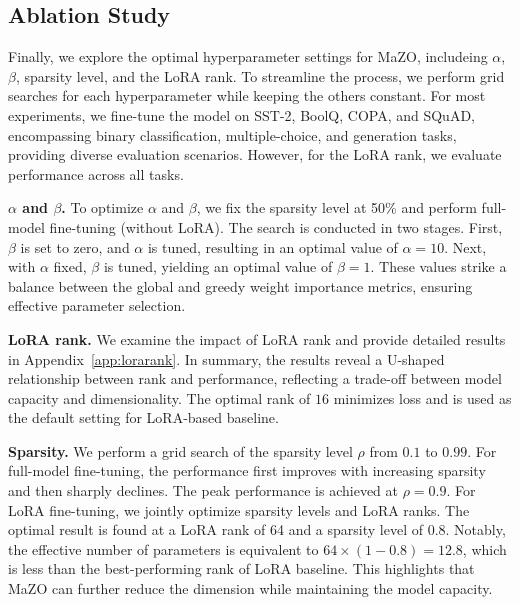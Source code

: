 \subsection{Ablation Study}  



Finally, we explore the optimal hyperparameter settings for MaZO, includeing $\alpha$, $\beta$, sparsity level, and the LoRA rank. To streamline the process, we perform grid searches for each hyperparameter while keeping the others constant. For most experiments, we fine-tune the model on SST-2, BoolQ, COPA, and SQuAD, encompassing binary classification, multiple-choice, and generation tasks, providing diverse evaluation scenarios. However, for the LoRA rank, we evaluate performance across all tasks.




\textbf{$\alpha$ and $\beta$.}  
To optimize $\alpha$ and $\beta$, we fix the sparsity level at 50\% and perform full-model fine-tuning (without LoRA). The search is conducted in two stages. First, $\beta$ is set to zero, and $\alpha$ is tuned, resulting in an optimal value of $\alpha = 10$. Next, with $\alpha$ fixed, $\beta$ is tuned, yielding an optimal value of $\beta = 1$. These values strike a balance between the global and greedy weight importance metrics, ensuring effective parameter selection.

\textbf{LoRA rank.} 
We examine the impact of LoRA rank and provide detailed results in Appendix~\ref{app:lorarank}. In summary, the results reveal a U-shaped relationship between rank and performance, reflecting a trade-off between model capacity and dimensionality. The optimal rank of $16$ minimizes loss and is used as the default setting for LoRA-based baseline.

\textbf{Sparsity.}  
We perform a grid search of the sparsity level $\rho$ from $0.1$ to $0.99$.
For full-model fine-tuning, the performance first improves with increasing sparsity and then sharply declines. The peak performance is achieved at $\rho = 0.9$. For LoRA fine-tuning, we jointly optimize sparsity levels and LoRA ranks. %
The optimal result is found at a LoRA rank of 64 and a sparsity level of $0.8$. Notably, the effective number of parameters is equivalent to $64 \times (1-0.8) = 12.8$, which is less than the best-performing rank of LoRA baseline. This highlights that MaZO can further reduce the dimension while maintaining the model capacity.








